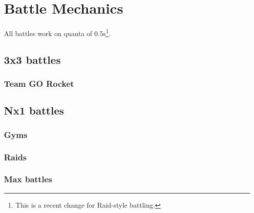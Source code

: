\chapter{Battle Mechanics}
\label{chap:battle}
All battles work on quanta of 0.5s\footnote{This is a recent change for Raid-style battling.}.

\section{3x3 battles}
\label{section:3x3}

\subsection{Team GO Rocket}
\label{subsection:rocket}

\section{Nx1 battles}
\label{section:nx1}

\subsection{Gyms}
\label{subsection:gyms}

\subsection{Raids}
\label{subsection:raids}

\subsection{Max battles}
\label{subsection:maxbattles}
